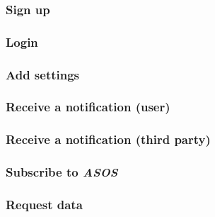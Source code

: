 \def\A {Name}
\def\B {Actors}
\def\C {Entry conditions}
\def\D {Event Flow}
\def\E {Exit conditions}
\def\F {Exceptions}
\def\G {Goals}
\def\H {Requirements}

\renewcommand{\arraystretch}{1.5}

\subsubsection{Sign up}


\subsubsection{Login}


\subsubsection{Add settings}


\subsubsection{Receive a notification (user)}


\subsubsection{Receive a notification (third party)}


\subsubsection{Subscribe to \textit{ASOS}}



\subsubsection{Request data}
